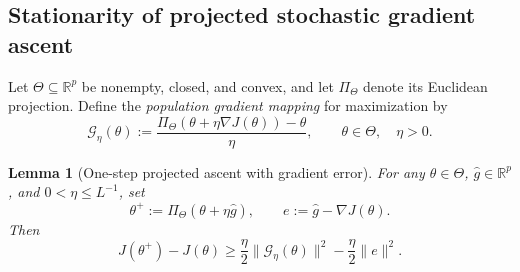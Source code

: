 \documentclass{article}
\newtheorem{lem}[thm]{Lemma}
\theoremstyle{definition}
\theoremstyle{remark}
\theoremstyle{mystyle}
\newcommand{\1}{\mathbbm{1}}
\begin{document}
\newpage


\subsection{Stationarity of projected stochastic gradient ascent}

Let $\Theta\subseteq\mathbb R^p$ be nonempty, closed, and convex,
and let $\Pi_\Theta$ denote its Euclidean projection. Define the
\emph{population gradient mapping} for maximization by
\begin{equation}
\mathcal G_\eta(\theta)
:=\frac{\Pi_\Theta(\theta+\eta\nabla J(\theta))-\theta}{\eta},
\qquad \theta\in\Theta,\quad \eta>0.
\label{eq:proj-pg-gradient-mapping}
\end{equation}

\begin{lem}[One-step projected ascent with gradient error]
\label{lem:proj-pg-one-step}
For any $\theta\in\Theta$, $\widehat g\in\mathbb R^p$, and
$0<\eta\le L^{-1}$, set
\[
\theta^+:=\Pi_\Theta(\theta+\eta\widehat g),
\qquad e:=\widehat g-\nabla J(\theta).
\]
Then
\begin{equation}
J(\theta^+)-J(\theta)
\ge \frac{\eta}{2}\|\mathcal G_\eta(\theta)\|^2
     -\frac{\eta}{2}\|e\|^2.
\label{eq:proj-pg-one-step}
\end{equation}
\end{lem}
\end{document}
